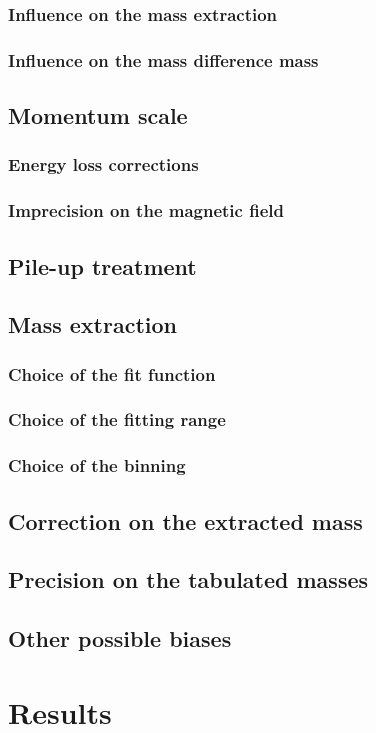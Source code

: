 \subsubsection{Influence on the mass extraction}

\subsubsection{Influence on the mass difference mass}

\subsection{Momentum scale}

\subsubsection{Energy loss corrections}

\subsubsection{Imprecision on the magnetic field}

\subsection{Pile-up treatment}

\subsection{Mass extraction}

\subsubsection{Choice of the fit function}

\subsubsection{Choice of the fitting range}

\subsubsection{Choice of the binning}

\subsection{Correction on the extracted mass}

\subsection{Precision on the tabulated masses}

\subsection{Other possible biases}

\section{Results}